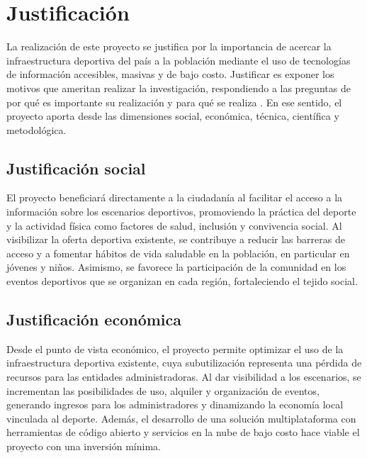 
\section{Justificaci\'on}

La realizaci\'on de este proyecto se justifica por la importancia de acercar la
infraestructura deportiva del pa\'is a la poblaci\'on mediante el uso de
tecnolog\'ias de informaci\'on accesibles, masivas y de bajo costo. Justificar es
exponer los motivos que ameritan realizar la investigaci\'on, respondiendo a
las preguntas de por qu\'e es importante su realizaci\'on y para qu\'e se realiza
\citep{arias2012}. En ese sentido, el proyecto aporta desde las dimensiones
social, econ\'omica, t\'ecnica, cient\'ifica y metodol\'ogica.

\subsection{Justificaci\'on social}

El proyecto beneficiar\'a directamente a la ciudadan\'ia al facilitar el acceso a
la informaci\'on sobre los escenarios deportivos, promoviendo la pr\'actica del
deporte y la actividad f\'isica como factores de salud, inclusi\'on y convivencia
social. Al visibilizar la oferta deportiva existente, se contribuye a reducir
las barreras de acceso y a fomentar h\'abitos de vida saludable en la
poblaci\'on, en particular en j\'ovenes y ni\~nos. Asimismo, se favorece la
participaci\'on de la comunidad en los eventos deportivos que se organizan en
cada regi\'on, fortaleciendo el tejido social.

\subsection{Justificaci\'on econ\'omica}

Desde el punto de vista econ\'omico, el proyecto permite optimizar el uso de la
infraestructura deportiva existente, cuya subutilizaci\'on representa una
p\'erdida de recursos para las entidades administradoras. Al dar visibilidad a
los escenarios, se incrementan las posibilidades de uso, alquiler y
organizaci\'on de eventos, generando ingresos para los administradores y
dinamizando la econom\'ia local vinculada al deporte. Adem\'as, el desarrollo de
una soluci\'on multiplataforma con herramientas de c\'odigo abierto y servicios
en la nube de bajo costo hace viable el proyecto con una inversi\'on m\'inima.

